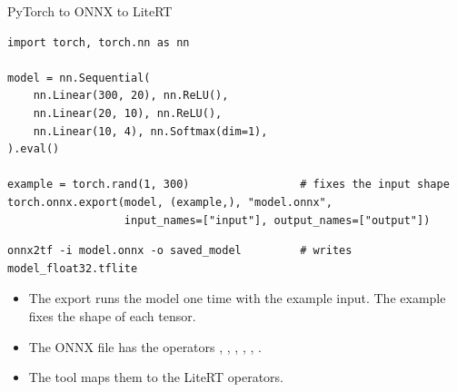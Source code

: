 \begin{frame}[fragile]{PyTorch to ONNX to LiteRT}
\begin{lstlisting}[style=python]
import torch, torch.nn as nn

model = nn.Sequential(
    nn.Linear(300, 20), nn.ReLU(),
    nn.Linear(20, 10), nn.ReLU(),
    nn.Linear(10, 4), nn.Softmax(dim=1),
).eval()

example = torch.rand(1, 300)                 # fixes the input shape
torch.onnx.export(model, (example,), "model.onnx",
                  input_names=["input"], output_names=["output"])
\end{lstlisting}
\begin{lstlisting}[style=shell]
onnx2tf -i model.onnx -o saved_model         # writes model_float32.tflite
\end{lstlisting}
  \small
  \begin{itemize}
    \item The export runs the model one time with the example input. The
          example fixes the shape of each tensor.
    \item The ONNX file has the operators , ,
          , , , .
    \item The tool  maps them to the LiteRT operators.
  \end{itemize}
\end{frame}

